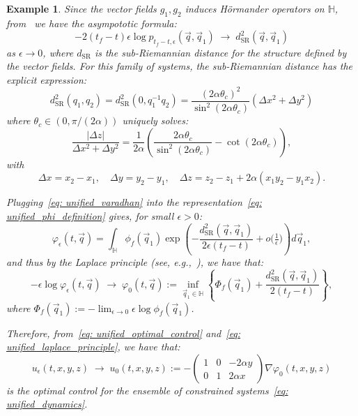 \documentclass{amsart}
\newtheorem{example}[theorem]{Example}
\numberwithin{equation}{section}
\begin{document}
\begin{example}
{Since the vector fields  $g_1, g_2$ induces H\"ormander operators on $\mathbb{H}$, from~\cite{BenArous1988,barilari2012small} we have the asympototic formula:
\begin{equation}\label{eq: unified_varadhan}
  -2(t_f - t) \epsilon \log p_{t_f - t,\epsilon}(\vec{q},\vec{q}_1)
  \;\longrightarrow\;
  d_{\mathrm{SR}}^2(\vec{q},\vec{q}_1)
\end{equation}
as $\epsilon\to 0$, where $d_{\mathrm{SR}}$ is the sub-Riemannian distance for the structure defined by the vector fields. For this family of systems, the sub-Riemannian distance has the explicit expression:
\[
d_{\mathrm{SR}}^2(q_1, q_2) = d_{\mathrm{SR}}^2(0, q_1^{-1} q_2)
=
\frac{(2\alpha\theta_c)^2}{\sin^2(2\alpha\theta_c)} (\Delta x^2 + \Delta y^2)
\]
where $\theta_c \in (0,\pi/(2\alpha))$ uniquely solves:
\[
\frac{|\Delta z|}{\Delta x^2 + \Delta y^2} = \frac{1}{2\alpha}\left(\frac{2\alpha\theta_c}{\sin^2(2\alpha\theta_c)} - \cot(2\alpha\theta_c)\right),
\]
with
\[
\Delta x = x_2 - x_1, \quad \Delta y = y_2 - y_1, \quad \Delta z = z_2 - z_1 + 2\alpha(x_1 y_2 - y_1 x_2).
\]

Plugging~\eqref{eq: unified_varadhan} into the representation~\eqref{eq: unified_phi_definition} gives, for small $\epsilon>0$:
\begin{equation}\label{eq: unified_phi_laplace}
  \varphi_\epsilon(t,\vec{q})
  = \int_{\mathbb{H}} \phi_f(\vec{q}_1)
    \exp\left(
      -\frac{d_{\mathrm{SR}}^2(\vec{q},\vec{q}_1)}{2\epsilon(t_f - t)}
      + o\bigl(\tfrac{1}{\epsilon}\bigr)
    \right) d\vec{q}_1,
\end{equation}
and thus by the Laplace principle (see, e.g.,~\cite{FreidlinWentzell2012}), we have that:
\begin{equation}\label{eq: unified_laplace_principle}
  -\epsilon \log \varphi_\epsilon(t,\vec{q})
  \;\longrightarrow\;
   \varphi_0(t,\vec{q}):=\inf_{\vec{q}_1\in\mathbb{H}}
  \left\{
    \Phi_f(\vec{q}_1)
    + \frac{d_{\mathrm{SR}}^2(\vec{q},\vec{q}_1)}{2(t_f - t)}
  \right\},
\end{equation}
where $\Phi_f(\vec{q}_1) := -\lim_{\epsilon\to 0}\epsilon \log \phi_f(\vec{q}_1)$.

Therefore, from~\eqref{eq: unified_optimal_control} and~\eqref{eq: unified_laplace_principle}, we have that:
\[
u_{\epsilon}(t,x,y,z)\;\longrightarrow\;u_0(t,x,y,z):=-\begin{pmatrix}
1 & 0 & -2\alpha y \\
0 & 1 & 2\alpha x
\end{pmatrix} \nabla\varphi_0(t,x,y,z)
\]
is the optimal control for the ensemble of constrained systems~\eqref{eq: unified_dynamics}.}
\end{example}




\end{document}
